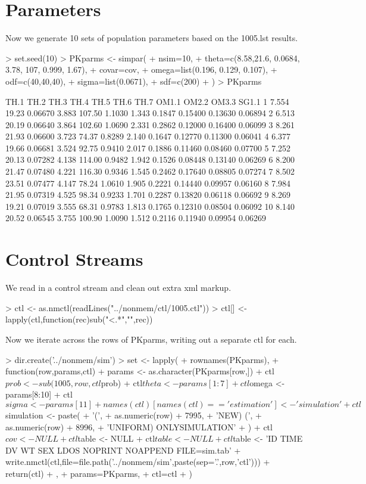 \section{Parameters}
Now we generate 10 sets of population parameters based on the 1005.lst results.
\begin{Schunk}
\begin{Sinput}
> set.seed(10)
> PKparms <- simpar(
+     nsim=10,
+     theta=c(8.58,21.6, 0.0684, 3.78, 107, 0.999, 1.67),
+     covar=cov,
+     omega=list(0.196, 0.129, 0.107),
+     odf=c(40,40,40),
+     sigma=list(0.0671),
+     sdf=c(200)
+ )
> PKparms
\end{Sinput}
\begin{Soutput}
    TH.1  TH.2    TH.3  TH.4   TH.5   TH.6  TH.7  OM1.1   OM2.2   OM3.3   SG1.1
1  7.554 19.23 0.06670 3.883 107.50 1.1030 1.343 0.1847 0.15400 0.13630 0.06894
2  6.513 20.19 0.06640 3.864 102.60 1.0690 2.331 0.2862 0.12000 0.16400 0.06099
3  8.261 21.93 0.06600 3.723  74.37 0.8289 2.140 0.1647 0.12770 0.11300 0.06041
4  6.377 19.66 0.06681 3.524  92.75 0.9410 2.017 0.1886 0.11460 0.08460 0.07700
5  7.252 20.13 0.07282 4.138 114.00 0.9482 1.942 0.1526 0.08448 0.13140 0.06269
6  8.200 21.47 0.07480 4.221 116.30 0.9346 1.545 0.2462 0.17640 0.08805 0.07274
7  8.502 23.51 0.07477 4.147  78.24 1.0610 1.905 0.2221 0.14440 0.09957 0.06160
8  7.984 21.95 0.07319 4.525  98.34 0.9233 1.701 0.2287 0.13820 0.06118 0.06692
9  8.269 19.21 0.07019 3.555  68.31 0.9783 1.813 0.1765 0.12310 0.08504 0.06092
10 8.140 20.52 0.06545 3.755 100.90 1.0090 1.512 0.2116 0.11940 0.09954 0.06269
\end{Soutput}
\end{Schunk}
\section{Control Streams}
We read in a control stream and clean out extra xml markup.
\begin{Schunk}
\begin{Sinput}
> ctl <- as.nmctl(readLines("../nonmem/ctl/1005.ctl"))
> ctl[] <- lapply(ctl,function(rec)sub("<.*","",rec))
\end{Sinput}
\end{Schunk}
Now we iterate across the rows of PKparms, writing out a separate ctl for each.
\begin{Schunk}
\begin{Sinput}
> dir.create('../nonmem/sim')
> set <- lapply(
+ 	rownames(PKparms),
+ 	function(row,params,ctl){
+ 		params <- as.character(PKparms[row,])
+ 		ctl$prob <- sub(1005,row,ctl$prob)
+ 		ctl$theta <- params[1:7]
+ 		ctl$omega <- params[8:10]
+ 		ctl$sigma <- params[11]
+ 		names(ctl)[names(ctl)=='estimation'] <- 'simulation'
+ 		ctl$simulation <- paste(
+ 			'(',
+ 			as.numeric(row) + 7995,
+ 			'NEW) (',
+ 			as.numeric(row) + 8996,
+ 			'UNIFORM) ONLYSIMULATION'
+ 		)
+ 		ctl$cov <- NULL
+ 		ctl$table <- NULL
+ 		ctl$table <- NULL
+ 		ctl$table <- 'ID TIME DV WT SEX LDOS NOPRINT NOAPPEND FILE=sim.tab'
+ 		write.nmctl(ctl,file=file.path('../nonmem/sim',paste(sep='.',row,'ctl')))
+ 		return(ctl)		
+ 	},
+ 	params=PKparms,
+ 	ctl=ctl
+ )
\end{Sinput}
\end{Schunk}
